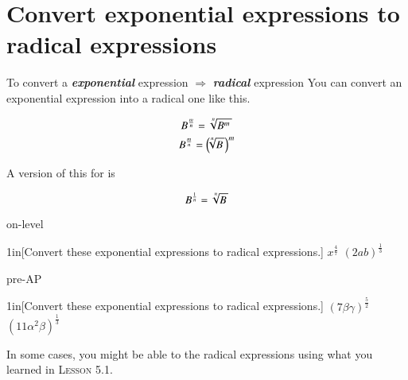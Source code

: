 \section*{Convert exponential expressions to radical expressions}
%
\begin{myConcept}{%
        To convert 
        a {\bfseries\itshape exponential} expression 
        $\Longrightarrow$
        {\bfseries\itshape radical} expression%
    }%
    You can convert an exponential expression into a radical one like this.
    \begin{myCenteredBox}[width=3.25in]
        \Large
        \[
            B ^ {\frac{m}{n}}
            =
            \myRoot[n]{B^m} 
        \]
        \[
            B ^ {\frac{m}{n}}
            =
            \left(\hspace{-0.25em} \myRoot[n]{B} \right)^m
        \]
    \end{myCenteredBox}
    A version of this for  is
    \begin{myCenteredBox}[width=3.25in]
        \Large
        \[
            B ^ {\frac{1}{n}}
            =
            \myRoot[n]{B}
        \]
    \end{myCenteredBox}
\end{myConcept}




\begin{taggedblock}{on-level}
    \begin{my2Problems}{1in}[Convert these exponential expressions to radical expressions.]
        {
            $ x^{\frac{4}{7}}$ 
        }
        {
            $ (2ab)^\frac{1}{3}$ 
        }
    \end{my2Problems}
\end{taggedblock}
\begin{taggedblock}{pre-AP}
    \begin{my2Problems}{1in}[Convert these exponential expressions to radical expressions.]
        {
            \Large $ (7\beta\gamma)^\frac{5}{2}$ 
        }
        {
            \Large $ (11\alpha^2\beta)^\frac{1}{3}$ 
        }
    \end{my2Problems}
\end{taggedblock}


\vspace{\baselineskip}
In some cases, you might be able to  the radical expressions using 
what you learned in {\scshape Lesson 5.1}.

